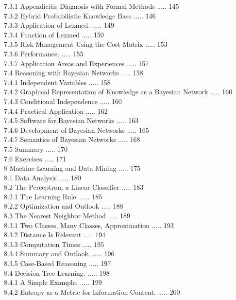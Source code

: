 \documentclass[10pt]{article}
\begin{document}
7.3.1 Appendicitis Diagnosis with Formal Methods ..... 145\\
7.3.2 Hybrid Probabilistic Knowledge Base ..... 146\\
7.3.3 Application of Lexmed. ..... 149\\
7.3.4 Function of Lexmed ..... 150\\
7.3.5 Risk Management Using the Cost Matrix ..... 153\\
7.3.6 Performance. ..... 155\\
7.3.7 Application Areas and Experiences ..... 157\\
7.4 Reasoning with Bayesian Networks ..... 158\\
7.4.1 Independent Variables ..... 158\\
7.4.2 Graphical Representation of Knowledge as a Bayesian Network ..... 160\\
7.4.3 Conditional Independence ..... 160\\
7.4.4 Practical Application ..... 162\\
7.4.5 Software for Bayesian Networks ..... 163\\
7.4.6 Development of Bayesian Networks ..... 165\\
7.4.7 Semantics of Bayesian Networks ..... 168\\
7.5 Summary ..... 170\\
7.6 Exercises ..... 171\\
8 Machine Learning and Data Mining ..... 175\\
8.1 Data Analysis ..... 180\\
8.2 The Perceptron, a Linear Classifier ..... 183\\
8.2.1 The Learning Rule. ..... 185\\
8.2.2 Optimization and Outlook ..... 188\\
8.3 The Nearest Neighbor Method ..... 189\\
8.3.1 Two Classes, Many Classes, Approximation ..... 193\\
8.3.2 Distance Is Relevant ..... 194\\
8.3.3 Computation Times ..... 195\\
8.3.4 Summary and Outlook. ..... 196\\
8.3.5 Case-Based Reasoning ..... 197\\
8.4 Decision Tree Learning. ..... 198\\
8.4.1 A Simple Example. ..... 199\\
8.4.2 Entropy as a Metric for Information Content. ..... 200\\
\end{document}
